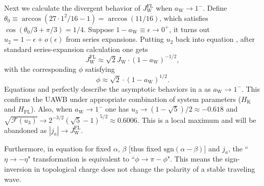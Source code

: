 \documentclass[12pt]{iopart}
\begin{document}
Next we calculate the divergent behavior of $J_{\mathrm{W}}^{\mathrm{FL}}$
when $a_{\mathrm{W}}\rightarrow 1^-$.
Define $\theta_0\equiv\arccos(27\cdot 1^2/16-1)=\arccos(11/16)$, which
satisfies $\cos\left(\theta_0/3+\pi/3\right)=1/4$.
Suppose $1-a_{\mathrm{W}}\equiv \epsilon\rightarrow 0^+$,
it turns out $u_2=1-\epsilon+o(\epsilon)$ from series expansions.
Putting $u_2$ back into equation , after standard series-expansion calculation one gets
\begin{equation}\label{WB_aW_1_only_FL_SOTs}
J_{\mathrm{W}}^{\mathrm{FL}}\approx\sqrt{2}J_{\mathrm{W}}\cdot\left(1-a_{\mathrm{W}}\right)^{-1/2},
\end{equation}
with the corresponding $\phi$ satisfying
\begin{equation}\label{phi_aW_1_only_FL_SOTs}
 \phi\approx\sqrt{2}\cdot\left(1-a_{\mathrm{W}}\right)^{1/2}.
\end{equation}
Equations  and 
perfectly describe the asymptotic behaviors in a as $a_{\mathrm{W}}\rightarrow 1^-$.
This confirms the UAWB under appropriate combination of 
system parameters ($H_{\mathrm{K}}$ and $H_{\mathrm{FL}}$).
Also, when $a_{\mathrm{W}}\rightarrow 1^-$ one has
$u_3\rightarrow (1-\sqrt{5})/2\approx-0.618$ and
$\sqrt{\mathcal{F}(u_3)}\rightarrow 2^{-3/2}(\sqrt{5}-1)^{5/2}\approx 0.6006$.
This is a local maximum and will be abandoned as $|j_a|\rightarrow J_{\mathrm{W}}^{\mathrm{FL}}$.

Furthermore, in equation  for fixed $\alpha$,
$\beta$ [thus fixed $\mathrm{sgn}(\alpha-\beta)$] and $j_a$,
the ``$\eta\rightarrow -\eta$" transformation is equivalent to
``$\phi\rightarrow\pi-\phi$". 
This means the sign-inversion in topological charge
does not change the polarity of a stable traveling wave.
\end{document}
